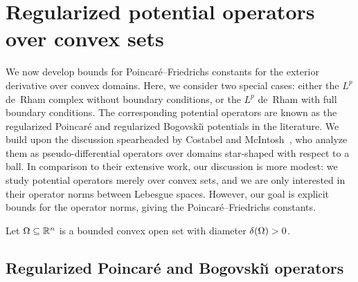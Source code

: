 \documentclass[10pt,a4paper]{article}
\newcommand{\todo}[1]{{\colorbox{yellow}{#1}}}
\newcommand{\mwl}[1]{{\color{red}#1}}
\begin{document}
\section{Regularized potential operators over convex sets}\label{section:potentialoperator}



We now develop bounds for Poincar\'e--Friedrichs constants for the exterior derivative over convex domains.
Here, we consider two special cases: 
either the $L^{p}$ de~Rham complex without boundary conditions, or the $L^{p}$ de~Rham with full boundary conditions. 
The corresponding potential operators are known as the regularized Poincar\'e and regularized Bogovski\u{\i} potentials in the literature. 
We build upon the discussion spearheaded by Costabel and McIntosh~\cite{costabel2010bogovskiui},
who analyze them as pseudo-differential operators over domains star-shaped with respect to a ball. 
% 
In comparison to their extensive work, our discussion is more modest:
we study potential operators merely over convex sets, and we are only interested in their operator norms between Lebesgue spaces.
However, our goal is explicit bounds for the operator norms, giving the Poincar\'e--Friedrichs constants. 

Let $\Omega \subseteq {\mathbb R}^{n}$ is a bounded convex open set with diameter ${\delta}(\Omega) > 0$.









\subsection{Regularized Poincar\'e and Bogovski\u{\i} operators}
\end{document}
